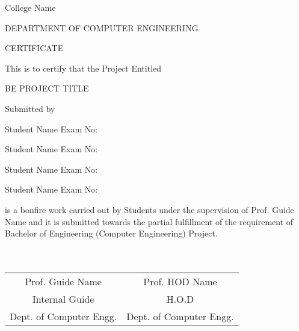 \documentclass[oneside,a4paper,12pt]{report}
\begin{document}
{\bfseries \fontsize{14}{12} \selectfont \centerline{College Name}
\centerline{DEPARTMENT OF COMPUTER ENGINEERING}
\vspace*{3\baselineskip}} 


{\bfseries \fontsize{16}{12} \selectfont \centerline{CERTIFICATE} 
\vspace*{3\baselineskip}} 

\centerline{This is to certify that the Project Entitled}
\vspace*{1\baselineskip} 


{\bfseries \fontsize{14}{12} \selectfont \centerline{BE PROJECT TITLE}
\vspace*{1\baselineskip}}

\centerline{Submitted by}
\vspace*{1\baselineskip} 
\centerline{Student Name  \hspace{25 mm} Exam No: } 
\centerline{Student Name \hspace{25 mm} Exam No:  } 
\centerline{Student Name \hspace{25 mm} Exam No: }
\centerline{Student Name \hspace{25 mm} Exam No: }
\vspace*{1\baselineskip} 
is a bonfire work carried out by Students under the supervision of Prof. Guide Name and it
is submitted towards the partial fulfillment of the requirement of Bachelor of Engineering (Computer Engineering) Project.\\\\\\

\bgroup
\def\arraystretch{0.7}
\begin{tabular}{c c }
Prof. Guide Name &  \hspace{50 mm} Prof. HOD Name \\								
Internal Guide   &  \hspace{50 mm} H.O.D \\
Dept. of Computer Engg.  &	\hspace{50 mm}Dept. of Computer Engg.  \\
\end{tabular}



\newpage

\setcounter{page}{0}
\frontmatter
{}
\rfoot{\thepage}
\end{document}
